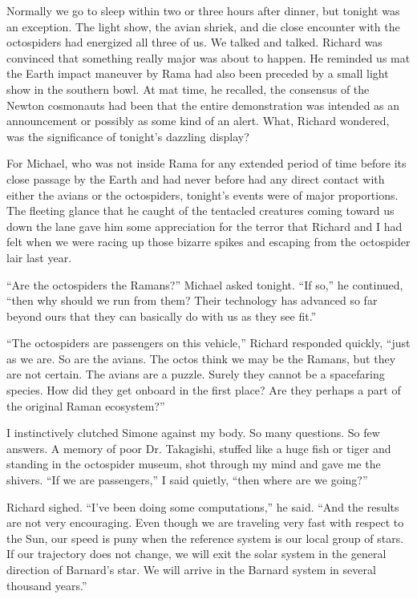 \documentclass[]{article}
\begin{document}
Normally we go to sleep within two or three hours after dinner, but tonight was an exception.  The light show, the avian shriek, and die close encounter with the octospiders had energized all three of us.  We talked and talked.  Richard was convinced that something really major was about to happen.  He reminded us mat the Earth impact maneuver by Rama had also been preceded by a small light show in the southern bowl.  At mat time, he recalled, the consensus of the Newton cosmonauts had been that the entire demonstration was intended as an announcement or possibly as some kind of an alert.  What, Richard wondered, was the significance of tonight’s dazzling display?

For Michael, who was not inside Rama for any extended period of time before its close passage by the Earth and had never before had any direct contact with either the avians or the octospiders, tonight’s events were of major proportions.  The fleeting glance that he caught of the tentacled creatures coming toward us down the lane gave him some appreciation for the terror that Richard and I had felt when we were racing up those bizarre spikes and escaping from the octospider lair last year.

“Are the octospiders the Ramans?” Michael asked tonight.  “If so,” he continued, “then why should we run from them? Their technology has advanced so far beyond ours that they can basically do with us as they see fit.”

“The octospiders are passengers on this vehicle,” Richard responded quickly, “just as we are.  So are the avians.  The octos think we may be the Ramans, but they are not certain.  The avians are a puzzle.  Surely they cannot be a spacefaring species.  How did they get onboard in the first place? Are they perhaps a part of the original Raman ecosystem?”

I instinctively clutched Simone against my body.  So many questions.  So few answers.  A memory of poor Dr.  Takagishi, stuffed like a huge fish or tiger and standing in the octospider museum, shot through my mind and gave me the shivers.  “If we are passengers,” I said quietly, “then where are we going?”

Richard sighed.  “I’ve been doing some computations,” he said.  “And the results are not very encouraging.  Even though we are traveling very fast with respect to the Sun, our speed is puny when the reference system is our local group of stars.  If our trajectory does not change, we will exit the solar system in the general direction of Barnard’s star.  We will arrive in the Barnard system in several thousand years.”
\end{document}
